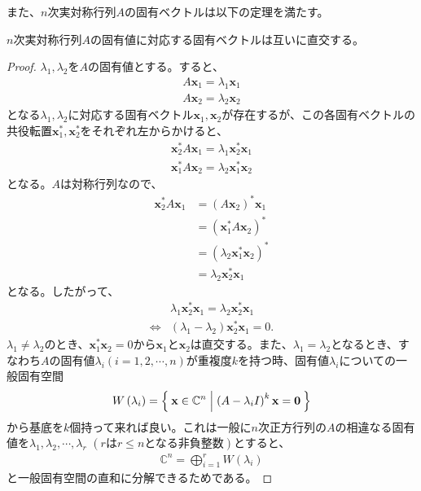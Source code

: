 また、$n$次実対称行列$A$の固有ベクトルは以下の定理を満たす。
\begin{theorem}
  $n$次実対称行列$A$の固有値に対応する固有ベクトルは互いに直交する。
\end{theorem}
\begin{proof}
  $\lambda_1,\lambda_2$を$A$の固有値とする。すると、
  \begin{align*}
    A \mathbf{x}_1 = \lambda_1 \mathbf{x}_1 \\
    A \mathbf{x}_2 = \lambda_2 \mathbf{x}_2
  \end{align*}
  となる$\lambda_1, \lambda_2$に対応する固有ベクトル$\mathbf{x}_1, \mathbf{x}_2$が存在するが、この各固有ベクトルの共役転置$\mathbf{x}_1^*, \mathbf{x}_2^*$をそれぞれ左からかけると、
  \begin{align*}
    \mathbf{x}_2^* A \mathbf{x}_1 = \lambda_1 \mathbf{x}_2^* \mathbf{x}_1 \\
    \mathbf{x}_1^* A \mathbf{x}_2 = \lambda_2 \mathbf{x}_1^* \mathbf{x}_2
  \end{align*}
  となる。$A$は対称行列なので、
  \begin{align*}
    \mathbf{x}_2^* A \mathbf{x}_1 & = \left(A \mathbf{x}_2\right)^* \mathbf{x}_1 \\
                                  & = \left(\mathbf{x}_1^* A \mathbf{x}_2\right)^* \\
                                  & = \left(\lambda_2 \mathbf{x}_1^* \mathbf{x}_2\right)^* \\
                                  & = \lambda_2 \mathbf{x}_2^* \mathbf{x}_1
  \end{align*}
  となる。したがって、
  \begin{align*}
                    & \lambda_1 \mathbf{x}_2^* \mathbf{x}_1 = \lambda_2 \mathbf{x}_2^* \mathbf{x}_1 \\
    \Leftrightarrow & \left(\lambda_1 - \lambda_2\right) \mathbf{x}_2^* \mathbf{x}_1 = 0.
  \end{align*}
  $\lambda_1 \not= \lambda_2$のとき、$\mathbf{x}_1^* \mathbf{x}_2 = 0$から$\mathbf{x}_1$と$\mathbf{x}_2$は直交する。また、$\lambda_1 = \lambda_2$となるとき、すなわち$A$の固有値$\lambda_i (i = 1, 2, \cdots, n)$が重複度$k$を持つ時、固有値$\lambda_i$についての一般固有空間
  \begin{align*}
    W \left(\lambda_i\right) = \Set{\mathbf{x} \in \mathbb{C}^n | \left(A - \lambda_i I\right)^k\mathbf{x} = \mathbf{0}}
  \end{align*}
  から基底を$k$個持って来れば良い。これは一般に$n$次正方行列の$A$の相違なる固有値を$\lambda_1, \lambda_2, \cdots, \lambda_r \,\, (r \text{は} r \leq n \text{となる非負整数})$とすると、
  \begin{align*}
    \mathbb{C}^n = \displaystyle{\bigoplus_{i = 1}^r} W \left(\lambda_i\right)
  \end{align*}
  と一般固有空間の直和に分解できるためである。
\end{proof}
